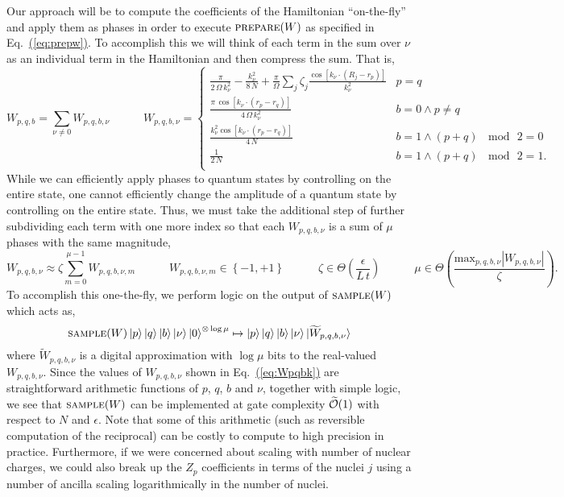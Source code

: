 \documentclass[superscriptaddress,aps,pra,nofootinbib,notitlepage,10pt,longbibliography]{revtex4-1}
\newcommand{\eq}[1]{Eq.~\hyperref[eq:#1]{(\ref*{eq:#1})}}
\def\ket#1{\mathinner{|{#1}\rangle}}
\begin{document}
Our approach will be to compute the coefficients of the Hamiltonian ``on-the-fly'' and apply them as phases in order to execute $\textsc{prepare}(W)$ as specified in \eq{prepw}. To accomplish this we will think of each term in the sum over $\nu$ as an individual term in the Hamiltonian and then compress the sum. That is,
\begin{equation}
\label{eq:Wpqbk}
W_{p,q,b} = \sum_{\nu \neq 0} W_{p,q,b,\nu} \quad \quad \quad
W_{p,q,b,\nu} = \begin{cases}
\frac{\pi}{2\, \Omega \, k_\nu^2} - \frac{k_\nu^2}{8 \, N} + \frac{\pi}{\Omega} \sum_{j}\zeta_j \frac{\cos\left[ k_\nu \cdot \left(R_j-r_p\right)\right]}{k_\nu^2}  & p = q \\
\frac{\pi \, \cos \left[k_\nu \cdot \left(r_p - r_q\right)\right]} {4 \, \Omega\,k_\nu^2} & b = 0 \wedge p \neq q \\
\frac{k_\nu^2 \cos \left[k_\nu \cdot \left(r_p - r_q \right) \right]}{4 \, N} & b = 1 \wedge (p + q) \, \!\!\mod\!\! \, 2 = 0\\
\frac{1}{2 \, N} & b = 1 \wedge (p + q) \, \!\!\mod\!\! \, 2 = 1.\\
\end{cases}
\end{equation}
While we can efficiently apply phases to quantum states by controlling on the entire state, one cannot efficiently change the amplitude of a quantum state by controlling on the entire state. Thus, we must take the additional step of further subdividing each term with one more index so that each $W_{p,q,b,\nu}$ is a sum of $\mu$ phases with the same magnitude,
\begin{equation}
W_{p,q,b,\nu} \approx \zeta \sum_{m=0}^{\mu-1} W_{p,q,b,\nu,m} \quad \quad \quad
%
W_{p,q,b,\nu,m} \in \left\{-1, +1\right\}
%
\quad \quad \quad
\zeta \in \Theta\left(\frac{\epsilon}{L \, t}\right) \quad \quad \quad
%
\mu \in \Theta\left(\frac{\textrm{max}_{p,q,b,\nu} \left | W_{p,q,b,\nu} \right |}{\zeta}\right).
\end{equation}
To accomplish this one-the-fly, we perform logic on the output of $\textsc{sample}(W)$ which acts as,
\begin{equation}
\textsc{sample}(W) \ket{p}\ket{q} \ket{b} \ket{\nu} \ket{0}^{\otimes \log \mu}
%
\mapsto \ket{p}\ket{q}\ket{b} \ket{\nu} \ket{\widetilde{W}_{p,q,b,\nu}}
\end{equation}
where $\widetilde{W}_{p,q,b,\nu}$ is a digital approximation with $\log \mu$ bits to the real-valued $W_{p,q,b,\nu}$. Since the values of $W_{p,q,b,\nu}$ shown in \eq{Wpqbk} are straightforward arithmetic functions of $p$, $q$, $b$ and $\nu$, together with simple logic, we see that $\textsc{sample}(W)$ can be implemented at gate complexity $\widetilde{\cal O}(1)$ with respect to $N$ and $\epsilon$. Note that some of this arithmetic (such as reversible computation of the reciprocal) can be costly to compute to high precision in practice. Furthermore, if we were concerned about scaling with number of nuclear charges, we could also break up the $Z_p$ coefficients in terms of the nuclei $j$ using a number of ancilla scaling logarithmically in the number of nuclei. 
\end{document}
